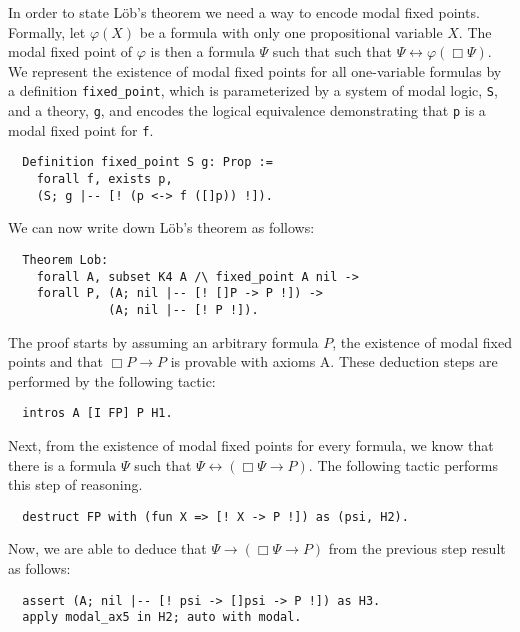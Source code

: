 \documentclass[sigconf]{acmart}
\begin{document}
In order to state L\"ob's theorem we need a way to encode modal
fixed points. Formally, let $\varphi(X)$ be a formula with only one propositional variable
$X$. The modal fixed point of $\varphi$ is then a formula $\Psi$ such that such that
$\Psi \leftrightarrow \varphi(\Box \Psi)$.
We represent the existence of modal fixed points for all one-variable formulas by a definition \texttt{fixed_point},
which is parameterized by a system of modal logic, \texttt{S}, and a
theory, \texttt{g}, and encodes the logical equivalence demonstrating
that \texttt{p} is a modal fixed point for \texttt{f}.
\begin{verbatim}
  Definition fixed_point S g: Prop :=
    forall f, exists p,
    (S; g |-- [! (p <-> f ([]p)) !]).
\end{verbatim}

\noindent We can now write down L\"ob's theorem as follows:

\begin{verbatim}
  Theorem Lob:
    forall A, subset K4 A /\ fixed_point A nil ->
    forall P, (A; nil |-- [! []P -> P !]) ->
              (A; nil |-- [! P !]).
\end{verbatim}

\noindent The proof starts by assuming an arbitrary formula $P$, the existence of modal fixed
points and that $\Box P \to P$ is provable with axioms A. These deduction steps
are performed by the following tactic:

\begin{verbatim}
  intros A [I FP] P H1.
\end{verbatim}

\noindent Next, from the existence of modal fixed points for every formula,
we know that there is a formula $\Psi$ such that $\Psi \leftrightarrow (\Box
\Psi \to P)$. The following tactic performs this step of reasoning.

\begin{verbatim}
  destruct FP with (fun X => [! X -> P !]) as (psi, H2).
\end{verbatim}

\noindent Now, we are able to deduce that $\Psi \to (\Box \Psi\to P)$ from the previous
step result as follows:

\begin{verbatim}
  assert (A; nil |-- [! psi -> []psi -> P !]) as H3.
  apply modal_ax5 in H2; auto with modal.
\end{verbatim}
\end{document}
